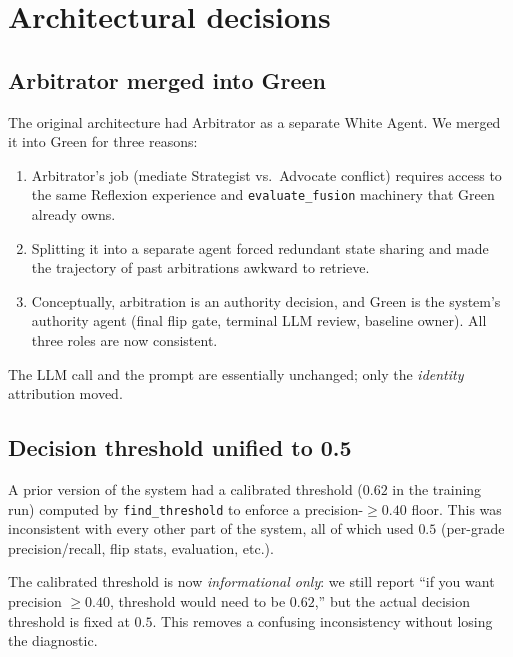 \documentclass[11pt,a4paper]{article}
\begin{document}
\section{Architectural decisions}
\label{sec:decisions}

\subsection{Arbitrator merged into Green}
\label{sec:design-arbitrator}

The original architecture had Arbitrator as a separate White Agent. We
merged it into Green for three reasons:

\begin{enumerate}[itemsep=0pt]
    \item Arbitrator's job (mediate Strategist vs.\ Advocate conflict) requires
          access to the same Reflexion experience and \texttt{evaluate\_fusion}
          machinery that Green already owns.
    \item Splitting it into a separate agent forced redundant state sharing
          and made the trajectory of past arbitrations awkward to retrieve.
    \item Conceptually, arbitration is an authority decision, and Green is
          the system's authority agent (final flip gate, terminal LLM review,
          baseline owner). All three roles are now consistent.
\end{enumerate}
\noindent
The LLM call and the prompt are essentially unchanged; only the
\emph{identity} attribution moved.

\subsection{Decision threshold unified to 0.5}

A prior version of the system had a calibrated threshold ($0.62$ in the
training run) computed by \texttt{find\_threshold} to enforce a
precision-$\geq 0.40$ floor. This was inconsistent with every other part
of the system, all of which used $0.5$ (per-grade precision/recall, flip
stats, evaluation, etc.).

The calibrated threshold is now \emph{informational only}: we still
report ``if you want precision $\geq 0.40$, threshold would need to be
$0.62$,'' but the actual decision threshold is fixed at $0.5$. This
removes a confusing inconsistency without losing the diagnostic.
\end{document}
